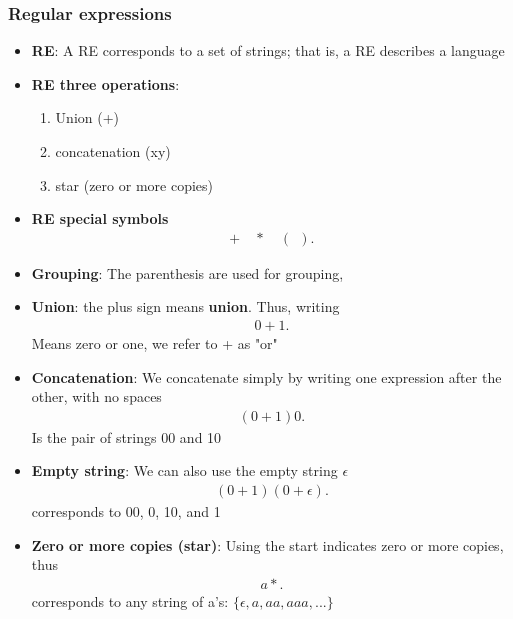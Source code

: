 \documentclass{report}
\begin{document}
    \subsubsection{Regular expressions}
    \begin{itemize}
        \item \textbf{RE}: A RE corresponds to a set of strings; that is, a RE describes a language
        \item \textbf{RE three operations}:
            \begin{enumerate}
                \item Union (+)
                \item concatenation (xy)
                \item star (zero or more copies)
            \end{enumerate}
        \item \textbf{RE special symbols}
            \begin{align*}
                + \quad * \quad (\ \ )
            .\end{align*}
        \item \textbf{Grouping}: The parenthesis are used for grouping, 
        \item \textbf{Union}: the plus sign means \textbf{union}. Thus, writing
            \begin{align*}
                0 + 1
            .\end{align*}
            Means zero or one, we refer to + as "or"
        \item \textbf{Concatenation}: We concatenate simply by writing one expression after the other, with no spaces
            \begin{align*}
                (0+1)0
            .\end{align*}
            Is the pair of strings 00 and 10
        \item \textbf{Empty string}: We can also use the empty string $\epsilon$
            \begin{align*}
                (0 + 1)(0 + \epsilon)
            .\end{align*}
            corresponds to 00, 0, 10, and 1
        \item \textbf{Zero or more copies (star)}: Using the start indicates zero or more copies, thus
            \begin{align*}
                a*
            .\end{align*}
            corresponds to any string of a's: $\{\epsilon, a,aa,aaa,...\} $

\end{itemize}
\end{document}
